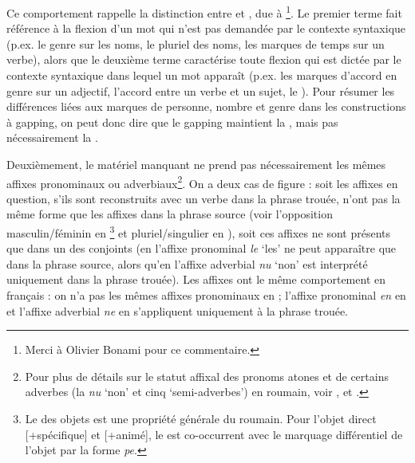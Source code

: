 Ce comportement rappelle la distinction entre  et , due à \citet{Booij1994,Booij1996,Booij2007}\footnote{
 Merci à Olivier Bonami pour ce commentaire.}. Le premier terme fait référence à la flexion d’un mot qui n’est pas demandée par le contexte syntaxique (p.ex. le genre sur les noms, le pluriel des noms, les marques de temps sur un verbe), alors que le deuxième terme caractérise toute flexion qui est dictée par le contexte syntaxique dans lequel un mot apparaît (p.ex. les marques d’accord en genre sur un adjectif, l’accord entre un verbe et un sujet, le ). Pour résumer les différences liées aux marques de personne, nombre et genre dans les constructions à gapping, on peut donc dire que le gapping maintient la , mais pas nécessairement la .

Deuxièmement, le matériel manquant ne prend pas nécessairement les mêmes affixes pronominaux ou adverbiaux\footnote{
 Pour plus de détails sur le statut affixal des pronoms atones et de certains adverbes (la  \textit{nu} ‘non’ et cinq ‘semi-adverbes’) en roumain, voir \citet{Barbu1999,Barbu2003}, \citet{Monachesi2005} et \citet{Bilbiie2011}.}. On a deux cas de figure : soit les affixes en question, s’ils sont reconstruits avec un verbe dans la phrase trouée, n’ont pas la même forme que les affixes dans la phrase source (voir l’opposition masculin/féminin en \footnote{
 Le  des objets est une propriété générale du roumain. Pour l’objet direct [+spécifique] et [+animé], le  est co-occurrent avec le marquage différentiel de l'objet par la forme \textit{pe}.} et pluriel/singulier en ), soit ces affixes ne sont présents que dans un des conjoints (en  l’affixe pronominal \textit{le} ‘les’ ne peut apparaître que dans la phrase source, alors qu’en  l’affixe adverbial \textit{nu} ‘non’ est interprété uniquement dans la phrase trouée). Les affixes ont le même comportement en français : on n’a pas les mêmes affixes pronominaux en  ; l’affixe pronominal \textit{en} en  et l’affixe adverbial \textit{ne} en  s’appliquent uniquement à la phrase trouée.

